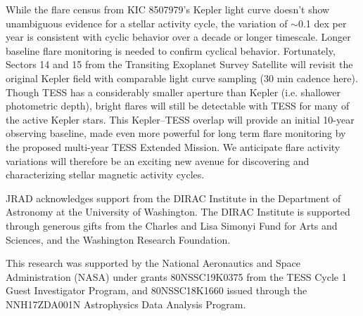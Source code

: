 \documentclass[RNAAS, modern]{aastex62}
\begin{document}
While the flare census from KIC 8507979's Kepler light curve doesn't show unambiguous evidence for a stellar activity cycle, the variation of $\sim$0.1 dex per year is consistent with cyclic behavior over a decade or longer timescale. Longer baseline flare monitoring is needed to confirm cyclical behavior.
Fortunately, Sectors 14 and 15 from the Transiting Exoplanet Survey Satellite \citep[TESS;][]{tess} will revisit the original Kepler field with comparable light curve sampling (30 min cadence here). Though TESS has a considerably smaller aperture than Kepler (i.e. shallower photometric depth), bright flares will still be detectable with TESS for many of the active Kepler stars. This Kepler--TESS overlap will provide an initial 10-year observing baseline, made even more powerful for long term flare monitoring by the proposed multi-year TESS Extended Mission. We anticipate flare activity variations will therefore be an exciting new avenue for discovering and characterizing stellar magnetic activity cycles.


\acknowledgements

JRAD acknowledges support from the DIRAC Institute in the Department of Astronomy at the University of Washington. The DIRAC Institute is supported through generous gifts from the Charles and Lisa Simonyi Fund for Arts and Sciences, and the Washington Research Foundation. 

This research was supported by the National Aeronautics and Space Administration (NASA) under grants 80NSSC19K0375 from the TESS Cycle 1 Guest Investigator Program, and 80NSSC18K1660 issued through the NNH17ZDA001N Astrophysics Data Analysis Program.




\end{document}
